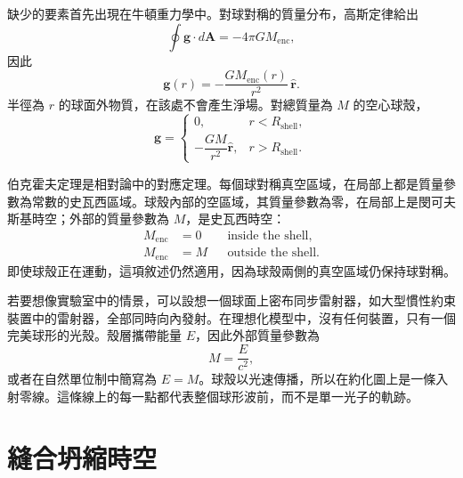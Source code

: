 缺少的要素首先出現在牛頓重力學中。對球對稱的質量分布，高斯定律給出
\begin{equation}
\oint\mathbf g\cdot d\mathbf A=-4\pi G M_{\mathrm{enc}},
\end{equation}
因此
\begin{equation}
\mathbf g(r)=-\frac{G M_{\mathrm{enc}}(r)}{r^2}\,\hat{\mathbf r}.
\label{eq:l05-shell-theorem}
\end{equation}
半徑為 \(r\) 的球面外物質，在該處不會產生淨場。對總質量為 \(M\) 的空心球殼，
\begin{equation}
\mathbf g=
\begin{cases}
0, & r<R_{\mathrm{shell}},\\[3pt]
-\dfrac{GM}{r^2}\hat{\mathbf r}, & r>R_{\mathrm{shell}}.
\end{cases}
\end{equation}

伯克霍夫定理是相對論中的對應定理。每個球對稱真空區域，在局部上都是質量參數為常數的史瓦西區域。球殼內部的空區域，其質量參數為零，在局部上是閔可夫斯基時空；外部的質量參數為 \(M\)，是史瓦西時空：
\begin{equation}
\begin{aligned}
M_{\mathrm{enc}}&=0 && \text{inside the shell},\\
M_{\mathrm{enc}}&=M && \text{outside the shell}.
\end{aligned}
\label{eq:l05-birkhoff}
\end{equation}
即使球殼正在運動，這項敘述仍然適用，因為球殼兩側的真空區域仍保持球對稱。


若要想像實驗室中的情景，可以設想一個球面上密布同步雷射器，如大型慣性約束裝置中的雷射器，全部同時向內發射。在理想化模型中，沒有任何裝置，只有一個完美球形的光殼。殼層攜帶能量 \(E\)，因此外部質量參數為
\begin{equation}
M=\frac{E}{c^2},
\end{equation}
或者在自然單位制中簡寫為 \(E=M\)。球殼以光速傳播，所以在約化圖上是一條入射零線。這條線上的每一點都代表整個球形波前，而不是單一光子的軌跡。

\section{縫合坍縮時空}

